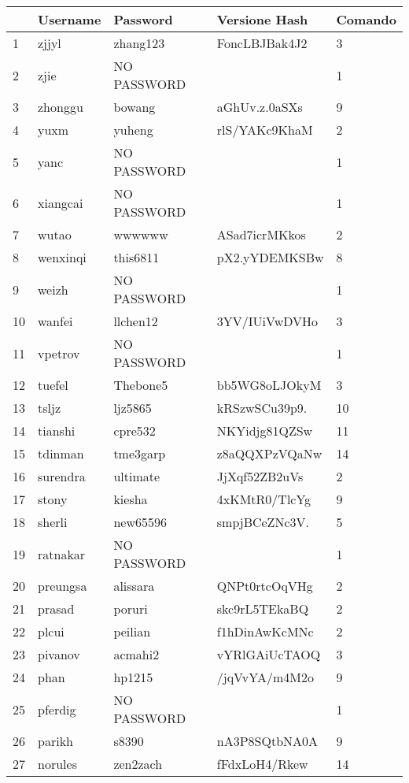 \documentclass[11pt]{article} %
\begin{document}
\begin{tabular}{|p{0.5cm}|p{3.1cm}|p{3.1cm}|p{3.3cm}|p{1.7cm}|}
\hline
 & \textbf{Username} & \textbf{Password} & \textbf{Versione Hash} & \textbf{Comando} \\ \hline
1 & zjjyl & zhang123 & FoncLBJBak4J2 &  3\\ \hline
2 & zjie & NO PASSWORD &	& 1 \\ \hline
3 & zhonggu & bowang & aGhUv.z.0aSXs &  9\\ \hline
4 & yuxm & yuheng & rlS/YAKc9KhaM & 2 \\ \hline
5 & yanc & NO PASSWORD &	& 1 \\ \hline
6 & xiangcai & NO PASSWORD & & 1\\ \hline
7 & wutao & wwwwww & ASad7icrMKkos & 2 \\ \hline
8 & wenxinqi & this6811 & pX2.yYDEMKSBw & 8\\ \hline
9 & weizh & NO PASSWORD &  & 1\\ \hline
10 & wanfei & llchen12 & 3YV/IUiVwDVHo & 3 \\ \hline
11 & vpetrov & NO PASSWORD & & 1\\ \hline
12 & tuefel & Thebone5 & bb5WG8oLJOkyM & 3 \\ \hline
13 & tsljz & ljz5865 & kRSzwSCu39p9. & 10 \\ \hline
14 & tianshi	& cpre532 & NKYidjg81QZSw & 11 \\ \hline
15 & tdinman & tme3garp & z8aQQXPzVQaNw & 14 \\ \hline
16 & surendra & ultimate & JjXqf52ZB2uVs & 2 \\ \hline
17 & stony & kiesha & 4xKMtR0/TlcYg & 9 \\ \hline
18 & sherli & new65596 & smpjBCeZNc3V. &  5\\ \hline
19 & ratnakar & NO PASSWORD & & 1\\ \hline
20 & preungsa & alissara & QNPt0rtcOqVHg & 2\\ \hline
21 & prasad & poruri & skc9rL5TEkaBQ & 2\\ \hline
22 & plcui & peilian & f1hDinAwKcMNc & 2\\ \hline
23 & pivanov & acmahi2 & vYRlGAiUcTAOQ & 3 \\ \hline
24 & phan & hp1215 & /jqVvYA/m4M2o & 9 \\ \hline
25 & pferdig & NO PASSWORD & & 1 \\ \hline
26 & parikh	& s8390 & nA3P8SQtbNA0A & 9 \\ \hline
27 & norules & zen2zach & fFdxLoH4/Rkew & 14 \\ \hline

\end{tabular}
\end{document}
